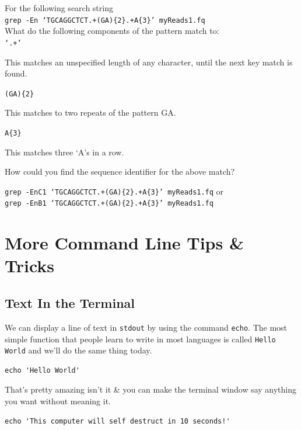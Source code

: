 \documentclass[a4paper,12pt,twoside]{memoir}
\begin{document}
\begin{questions}
For the following search string \\
\texttt{grep -En `TGCAGGCTCT.+(GA)\{2\}.+A\{3\}' myReads1.fq} \\
What do the following components of the pattern match to: \\
\texttt{`.+'} \\
\begin{answer}
This matches an unspecified length of any character, until the next key match is found. \\
\end{answer}

\texttt{(GA)\{2\}} \\
\begin{answer}
This matches to two repeats of the pattern GA. \\
\end{answer}

\texttt{A\{3\}}\\
\begin{answer}
This matches three `A's in a row. \\
\end{answer}

How could you find the sequence identifier for the above match?\\
\begin{answer}
\texttt{grep -EnC1 `TGCAGGCTCT.+(GA)\{2\}.+A\{3\}' myReads1.fq} or \\
\texttt{grep -EnB1 `TGCAGGCTCT.+(GA)\{2\}.+A\{3\}' myReads1.fq}
\end{answer}
\end{questions}

\chapter{More Command Line Tips \& Tricks}

\section{Text In the Terminal}
We can display a line of text in \texttt{stdout} by using the command \texttt{echo}.
The most simple function that people learn to write in most languages is called \texttt{Hello World} and we'll do the same thing today.
\begin{steps}
\begin{lstlisting}
echo 'Hello World'
\end{lstlisting}
\end{steps}
That's pretty amazing isn't it \& you can make the terminal window say anything you want without meaning it.\\
\begin{lstlisting}
echo 'This computer will self destruct in 10 seconds!'
\end{lstlisting}
\end{document}
